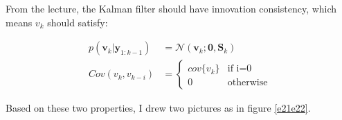 From the lecture, the Kalman filter should have innovation consistency, which means $ v_k $ should satisfy:

\begin{equation}
    \begin{aligned}
        p(\textbf{v}_k\big|\textbf{y}_{1:k-1})&=\mathcal{N}(\textbf{v}_k;\textbf{0},\textbf{S}_k)\\
        Cov(v_k,v_{k-i})&=\begin{cases} cov\{v_k\}  & \text{if i=0}\\0 & \text{otherwise}\end{cases}\nonumber
    \end{aligned}
\end{equation}

Based on these two properties, I drew two pictures as in figure \ref{e21e22}.
